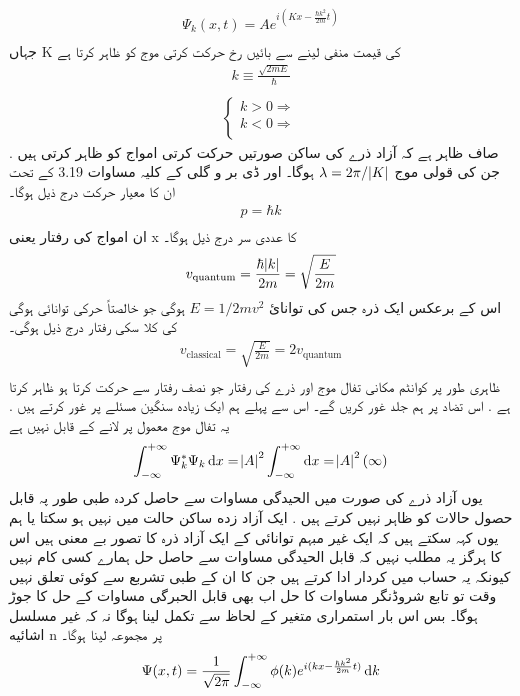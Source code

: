 \documentclass{book}
\begin{document}
\begin{align*}
\Psi_{k}(x,t)=Ae^{i(Kx-\frac{\hbar k^{2}}{2m}t)}\\
\end{align*}
جہاں
K
کی قیمت منفی لینے سے بائیں رخ حرکت کرتی موج کو ظاہر کرتا ہے
\begin{align*}
k\equiv\frac{\sqrt{2mE}}{\hbar}\\
\end{align*}
\begin{align*}
\begin{cases}
k>0\Rightarrow \\
k<0\Rightarrow \\
\end{cases}
\end{align*}
صاف ظاہر ہے کہ آزاد ذرے کی ساکن صورتیں حرکت کرتی امواج کو ظاہر کرتی ہیں . جن کی قولی موج
\(\lambda=2\pi/\abs{K}\)
ہوگا۔ اور ڈی بر و گلی کے کلیہ مساوات 3.19 کے تحت ان کا معیار حرکت درج ذیل ہوگا۔
\begin{align*}
p=\hbar k\\
\end{align*}
ان امواج کی رفتار یعنی
x
کا عددی سر درج ذیل ہوگا۔
\begin{align*}
v_{\text{quantum}}=\frac{\hbar\abs{k}}{2m}=\sqrt{\frac{E}{2m}}\\
\end{align*}
اس کے برعکس ایک ذرہ جس کی توانائ
\(E=1/2mv^{2}\)
ہوگی جو خالصتاً حرکی توانائی ہوگی کی کلا سکی رفتار درج ذیل ہوگی۔
\begin{align*}
v_{\text{classical}}=\sqrt{\frac{E}{2m}}=2v_{\text{quantum}}\\
\end{align*}
ظاہری طور پر کوانٹم مکانی تفال موج اور ذرے کی رفتار جو نصف رفتار سے حرکت کرتا ہو ظاہر کرتا ہے . اس تضاد پر ہم جلد غور کریں گے۔ اس سے پہلے ہم ایک زیاده سنگین مسئلے پر غور کرتے ہیں . یہ تفال موج معمول پر لانے کے قابل نہیں ہے 
\begin{align*}
\int_{-\infty}^{+\infty}\Psi_{k}^{*}\Psi_{k}\dif{x}=\abs{A}^{2}\int_{-\infty}^{+\infty}\dif{x}=\abs{A}^{2}(\infty)\\
\end{align*}
یوں آزاد ذرے کی صورت میں الحیدگی مساوات سے حاصل کردہ طبی طور پہ قابل حصول حالات کو ظاہر نہیں کرتے ہیں . ایک آزاد زده ساکن حالت میں نہیں ہو سکتا یا ہم یوں کہہ سکتے ہیں کہ ایک غیر مبہم توانائی کے ایک آزاد ذرہ کا تصور بے معنی ہیں اس کا ہرگز یہ مطلب نہیں کہ قابل الحیدگی مساوات سے حاصل حل ہمارے کسی کام نہیں کیونکہ یہ حساب میں کردار ادا کرتے ہیں جن کا ان کے طبی تشربع سے کوئی تعلق نہیں وقت تو تابع شروڈنگر مساوات کا حل اب بھی قابل الحبرگی مساوات کے حل کا جوڑ ہوگا۔ بس اس بار استمراری متغیر کے لحاظ سے تکمل لینا ہوگا نہ کہ غیر مسلسل اشائیه
n
پر مجموعہ لینا ہوگا۔
\begin{align*}
\Psi(x,t)=\frac{1}{\sqrt{2\pi}}\int_{-\infty}^{+\infty}\phi(k)e^{i(kx-\frac{\hbar k^{2}}{2m}t)}\dif{k}\\
\end{align*}
\end{document}
